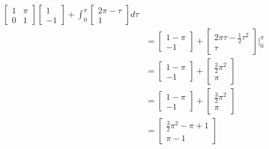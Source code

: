 \begin{example}
\begin{equation*}
\begin{split}
\begin{bmatrix}
        1 & \pi \\ 0 & 1
      \end{bmatrix}
      \begin{bmatrix}
        1 \\ -1
      \end{bmatrix}+
      \int_{0}^{\pi}
      \begin{bmatrix}
        2\pi-\tau \\ 1
      \end{bmatrix}
      d\tau \\
      &=
      \begin{bmatrix}
        1-\pi \\ -1
      \end{bmatrix}+
      \begin{bmatrix}
        2\pi\tau-\frac{1}{2}\tau^{2} \\ \tau
      \end{bmatrix} \Biggr|_{0}^{\pi} \\
      &=
      \begin{bmatrix}
        1-\pi \\ -1
      \end{bmatrix}+
      \begin{bmatrix}
        \frac{3}{2}\pi^{2} \\ \pi
      \end{bmatrix} \\
      &=
      \begin{bmatrix}
        1-\pi \\ -1
      \end{bmatrix}+
      \begin{bmatrix}
        \frac{3}{2}\pi^{2} \\ \pi
      \end{bmatrix} \\
      &=
      \begin{bmatrix}
        \frac{3}{2}\pi^{2}-\pi+1 \\ \pi-1
      \end{bmatrix}
    \end{split}
  \end{equation*}
\end{example}


